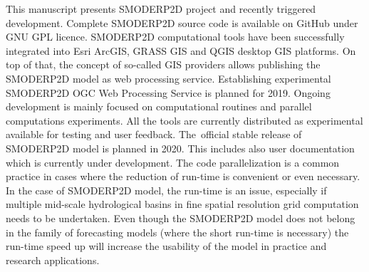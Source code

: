 This manuscript presents SMODERP2D project and recently triggered 
development. Complete SMODERP2D source code is available on GitHub 
\cite{xxx} under GNU GPL licence. SMODERP2D computational tools have 
been successfully integrated into Esri ArcGIS, GRASS GIS and QGIS desktop GIS platforms. On top of that, the concept of so-called GIS providers allows publishing the SMODERP2D model as web processing service. Establishing experimental SMODERP2D 
OGC Web Processing Service is planned for 2019. Ongoing development 
is mainly focused on computational routines and parallel computations experiments. All the tools are currently distributed as experimental available for testing and user feedback.
The~official stable release of SMODERP2D model is planned in 2020. This 
includes also user documentation which is currently under development. 
The code parallelization is a common practice in cases where 
the reduction of run-time is convenient or even necessary. In the 
case of SMODERP2D model, the run-time is an issue, especially 
if multiple mid-scale hydrological basins in fine spatial 
resolution grid computation needs to be undertaken. Even 
though the SMODERP2D model does not belong in the family of forecasting 
models (where the short run-time is necessary)  the run-time speed 
up will increase the usability of the model in practice and research applications. 
